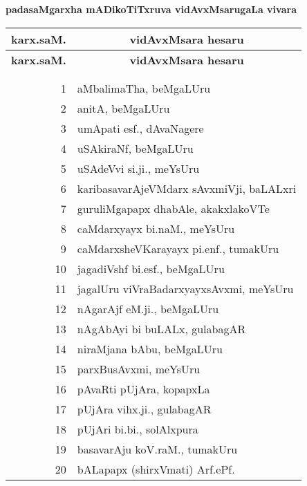 \begin{center}
{\large\bf padasaMgarxha mADikoTiTxruva vidAvxMsarugaLa vivara}

\thispagestyle{empty}

\lhead[]{}
\rhead[]{}

\begin{minipage}[t]{7cm}
{\renewcommand{\arraystretch}{1.5}
\begin{longtable}{rl}
\hline
{\bf karx.saM.} & \multicolumn{1}{c}{\bf vidAvxMsara hesaru}\\[3pt]
\hline
\endfirsthead
\hline
{\bf karx.saM.} & \multicolumn{1}{c}{\bf vidAvxMsara hesaru}\\[3pt]
\hline
  & \\[-10pt]
\endhead
\endfoot
\endlastfoot
  & \\[-15pt]
1 & aMbalimaTha, beMgaLUru\\
2 & anitA, beMgaLUru\\
3 &  umApati esf., dAvaNagere\\
4 &  uSAkiraNf, beMgaLUru\\
5 &  uSAdeVvi si.ji., meYsUru\\
6 & karibasavarAjeVMdarx sAvxmiVji, baLALxri\\
7 & guruliMgapapx dhabAle, akakxlakoVTe\\
8 &  caMdarxyayx bi.naM., meYsUru\\
9 &  caMdarxsheVKarayayx pi.enf., tumakUru\\
10 & jagadiVshf bi.esf., beMgaLUru\\
11 & jagalUru viVraBadarxyayxsAvxmi, meYsUru\\
12 & nAgarAjf eM.ji., beMgaLUru\\
13 &  nAgAbAyi bi buLALx, gulabagAR\\
14 & niraMjana bAbu, beMgaLUru\\
15 & parxBusAvxmi, meYsUru\\
16 &  pAvaRti pUjAra, kopapxLa\\
17 & pUjAra vihx.ji., gulabagAR\\
18 &  pUjAri bi.bi., solAlxpura\\
19 &  basavarAju koV.raM., tumakUru\\
20 & bALapapx (shirxVmati) Arf.ePf.
\end{longtable}}
\end{minipage}

\end{center}
